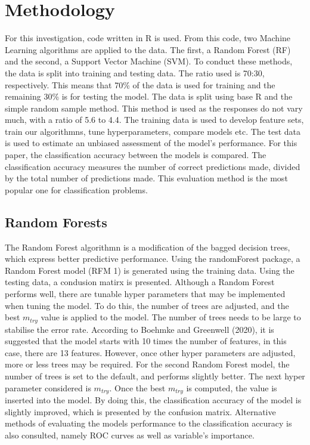 \documentclass[11pt,preprint, authoryear]{elsarticle}
\numberwithin{equation}{section}
\numberwithin{figure}{section}
\numberwithin{table}{section}
\begin{document}
\hypertarget{methodology}{%
\section{Methodology}\label{methodology}}

For this investigation, code written in R is used. From this code, two
Machine Learning algorithms are applied to the data. The first, a Random
Forest (RF) and the second, a Support Vector Machine (SVM). To conduct
these methods, the data is split into training and testing data. The
ratio used is 70:30, respectively. This means that 70\% of the data is
used for training and the remaining 30\% is for testing the model. The
data is split using base R and the simple random sample method. This
method is used as the responses do not vary much, with a ratio of 5.6 to
4.4. The training data is used to develop feature sets, train our
algorithmns, tune hyperparameters, compare models etc. The test data is
used to estimate an unbiased assessment of the model's performance. For
this paper, the classification accuracy between the models is compared.
The classification accuracy measures the number of correct predictions
made, divided by the total number of predictions made. This evaluation
method is the most popular one for classification problems.

\hypertarget{random-forests}{%
\subsection{Random Forests}\label{random-forests}}

The Random Forest algorithmn is a modification of the bagged decision
trees, which express better predictive performance. Using the
randomForest package, a Random Forest model (RFM 1) is generated using
the training data. Using the testing data, a condusion matirx is
presented. Although a Random Forest performs well, there are tunable
hyper parameters that may be implemented when tuning the model. To do
this, the number of trees are adjusted, and the best \(m_{try}\) value
is applied to the model. The number of trees needs to be large to
stabilise the error rate. According to Boehmke and Greenwell (2020), it
is suggested that the model starts with 10 times the number of features,
in this case, there are 13 features. However, once other hyper
parameters are adjusted, more or less trees may be required. For the
second Random Forest model, the number of trees is set to the default,
and performs slightly better. The next hyper parameter considered is
\(m_{try}\). Once the best \(m_{try}\) is computed, the value is
inserted into the model. By doing this, the classification accuracy of
the model is slightly improved, which is presented by the confusion
matrix. Alternative methods of evaluating the models performance to the
classification accuracy is also consulted, namely ROC curves as well as
variable's importance.
\end{document}
